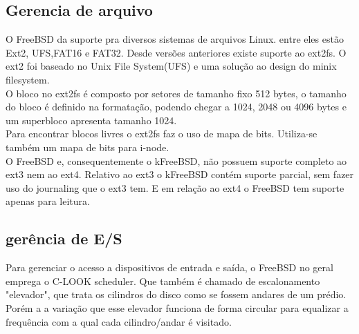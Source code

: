 \documentclass[conference]{IEEEtran}
\begin{document}
\subsection{Gerencia de arquivo}\label{sec:BSDArquivo}
O FreeBSD da suporte pra diversos sistemas de arquivos Linux. entre eles estão Ext2, UFS,FAT16 e FAT32. Desde versões anteriores existe suporte ao ext2fs. O ext2 foi baseado no Unix File System(UFS) e uma solução ao design do minix filesystem.\\

O bloco no ext2fs é composto por setores de tamanho fixo 512 bytes, o tamanho do bloco é definido na formatação, podendo chegar a 1024, 2048 ou 4096 bytes e um superbloco apresenta tamanho 1024. \\ 
Para encontrar blocos livres o ext2fs faz o uso de mapa de bits. Utiliza-se também um mapa de bits para i-node.\\ 

O FreeBSD e, consequentemente o kFreeBSD, não possuem suporte completo ao ext3 nem ao ext4. Relativo ao ext3 o kFreeBSD contém suporte parcial, sem fazer uso do journaling que o ext3 tem. E em relação ao ext4 o FreeBSD tem suporte apenas para leitura.\cite{kFreeBSD-ext4}\\
\subsection{gerência de E/S}\label{sec:BSDES}
Para gerenciar o acesso a dispositivos de entrada e saída, o FreeBSD no geral emprega o C-LOOK scheduler\cite{FreeBSD-Hybrid}. Que também é chamado de escalonamento "elevador", que trata os cilindros do disco como se fossem andares de um prédio. Porém a a variação que esse elevador funciona de forma circular para equalizar a frequência com a qual cada cilindro/andar é visitado.\\
\end{document}
